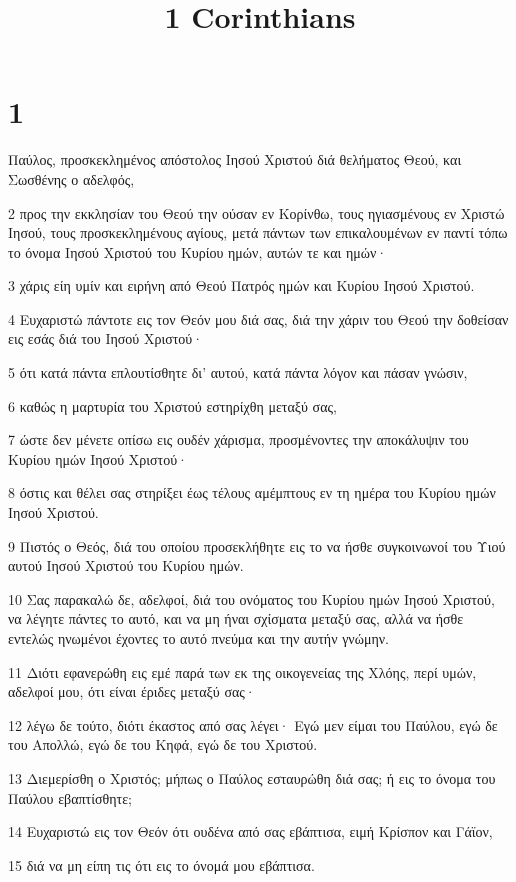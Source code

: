 

\title{1 Corinthians}


\chapter{1}

\par Παύλος, προσκεκλημένος απόστολος Ιησού Χριστού διά θελήματος Θεού, και Σωσθένης ο αδελφός,
\par 2 προς την εκκλησίαν του Θεού την ούσαν εν Κορίνθω, τους ηγιασμένους εν Χριστώ Ιησού, τους προσκεκλημένους αγίους, μετά πάντων των επικαλουμένων εν παντί τόπω το όνομα Ιησού Χριστού του Κυρίου ημών, αυτών τε και ημών·
\par 3 χάρις είη υμίν και ειρήνη από Θεού Πατρός ημών και Κυρίου Ιησού Χριστού.
\par 4 Ευχαριστώ πάντοτε εις τον Θεόν μου διά σας, διά την χάριν του Θεού την δοθείσαν εις εσάς διά του Ιησού Χριστού·
\par 5 ότι κατά πάντα επλουτίσθητε δι' αυτού, κατά πάντα λόγον και πάσαν γνώσιν,
\par 6 καθώς η μαρτυρία του Χριστού εστηρίχθη μεταξύ σας,
\par 7 ώστε δεν μένετε οπίσω εις ουδέν χάρισμα, προσμένοντες την αποκάλυψιν του Κυρίου ημών Ιησού Χριστού·
\par 8 όστις και θέλει σας στηρίξει έως τέλους αμέμπτους εν τη ημέρα του Κυρίου ημών Ιησού Χριστού.
\par 9 Πιστός ο Θεός, διά του οποίου προσεκλήθητε εις το να ήσθε συγκοινωνοί του Υιού αυτού Ιησού Χριστού του Κυρίου ημών.
\par 10 Σας παρακαλώ δε, αδελφοί, διά του ονόματος του Κυρίου ημών Ιησού Χριστού, να λέγητε πάντες το αυτό, και να μη ήναι σχίσματα μεταξύ σας, αλλά να ήσθε εντελώς ηνωμένοι έχοντες το αυτό πνεύμα και την αυτήν γνώμην.
\par 11 Διότι εφανερώθη εις εμέ παρά των εκ της οικογενείας της Χλόης, περί υμών, αδελφοί μου, ότι είναι έριδες μεταξύ σας·
\par 12 λέγω δε τούτο, διότι έκαστος από σας λέγει· Εγώ μεν είμαι του Παύλου, εγώ δε του Απολλώ, εγώ δε του Κηφά, εγώ δε του Χριστού.
\par 13 Διεμερίσθη ο Χριστός; μήπως ο Παύλος εσταυρώθη διά σας; ή εις το όνομα του Παύλου εβαπτίσθητε;
\par 14 Ευχαριστώ εις τον Θεόν ότι ουδένα από σας εβάπτισα, ειμή Κρίσπον και Γάϊον,
\par 15 διά να μη είπη τις ότι εις το όνομά μου εβάπτισα.
